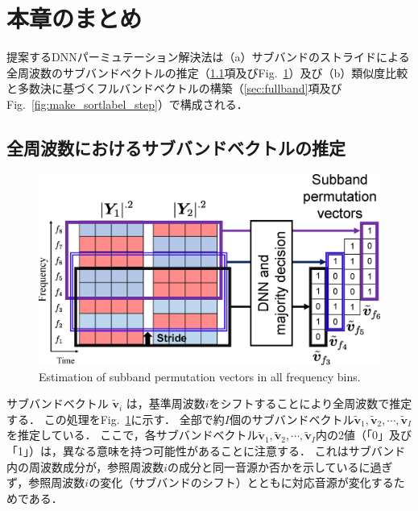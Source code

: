 \section{本章のまとめ}
\label{sec:Fullband}
提案するDNNパーミュテーション解決法は（a）サブバンドのストライドによる全周波数のサブバンドベクトルの推定（\ref{sec:pred}項及びFig.~\ref{fig:estimate_allfreq_labels}）及び（b）類似度比較と多数決に基づくフルバンドベクトルの構築（\ref{sec:fullband}項及び Fig.~\ref{fig:make_sortlabel_step}）で構成される．

\subsection{全周波数におけるサブバンドベクトルの推定}
\label{sec:pred}
\begin{figure}[t]
    \begin{center}
        \includegraphics[width=0.9\columnwidth]{figures/estimate_allfreq_labels.eps}
    \end{center}
    \vspace{-15pt}
	\caption{Estimation of subband permutation vectors in all frequency bins.}
	\label{fig:estimate_allfreq_labels}
	\vspace{-8pt}   %
\end{figure}
サブバンドベクトル $\tilde{\bm{v}}_i$ は，基準周波数$i$をシフトすることにより全周波数で推定する．
この処理をFig.~\ref{fig:estimate_allfreq_labels}に示す．
全部で約$I$個のサブバンドベクトル$\tilde{\bm{v}}_1, \tilde{\bm{v}}_2, \cdots, \tilde{\bm{v}}_I$を推定している．
ここで，各サブバンドベクトル$\tilde{\bm{v}}_1, \tilde{\bm{v}}_2, \cdots, \tilde{\bm{v}}_I$内の2値（「0」及び「1」）は，異なる意味を持つ可能性があることに注意する．
これはサブバンド内の周波数成分が，参照周波数$i$の成分と同一音源か否かを示しているに過ぎず，参照周波数$i$の変化（サブバンドのシフト）とともに対応音源が変化するためである．

